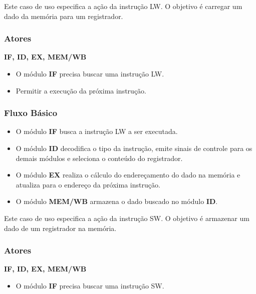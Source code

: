 
Este caso de uso especifica a ação da instrução LW. O objetivo é carregar um dado da memória para um registrador.
 
\subsubsection*{Atores}
\textbf{IF, ID, EX, MEM/WB}

\preconditions 
\begin{itemize}
 \item O módulo \textbf{IF} precisa buscar uma instrução LW.
\end{itemize}

\postconditions
\begin{itemize}
  \item Permitir a execução da próxima instrução.
\end{itemize}

\subsubsection*{Fluxo Básico}
\begin{itemize}
\item O módulo \textbf{IF} busca a instrução LW a ser executada.
\item O módulo \textbf{ID} decodifica o tipo da instrução, emite sinais de controle para os demais módulos e seleciona o conteúdo do registrador.
\item O módulo \textbf{EX} realiza o cálculo do endereçamento do dado na memória e atualiza para o endereço da próxima instrução.

\item O módulo \textbf{MEM/WB} armazena o dado buscado no módulo \textbf{ID}.
\end{itemize}


Este caso de uso especifica a ação da instrução SW. O objetivo é armazenar um dado de um registrador na memória.

\subsubsection*{Atores}
\textbf{IF, ID, EX, MEM/WB}

\preconditions 
\begin{itemize}
	\item O módulo \textbf{IF} precisa buscar uma instrução SW.
\end{itemize}

